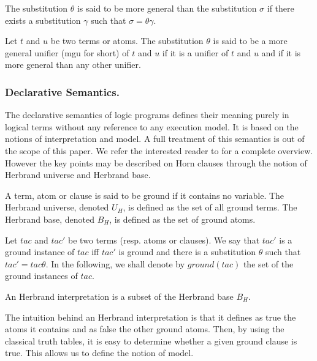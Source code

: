 \begin{definition}
The substitution $\theta$ is said to be more general than the
substitution $\sigma$ if there exists a substitution $\gamma$ such
that $\sigma = \theta\gamma$.
\end{definition}

\begin{definition}
Let $t$ and $u$ be two terms or atoms. The substitution $\theta$ is
said to be a more general unifier (mgu for short) of $t$ and $u$ if it
is a unifier of $t$ and $u$ and if it is more general than any other
unifier.
\end{definition}

\subsubsection{Declarative Semantics.}
The declarative semantics of logic programs defines their meaning
purely in logical terms without any reference to any execution
model. It is based on the notions of interpretation and model. A full
treatment of this semantics is out of the scope of this paper. We
refer the interested reader to \cite{Lloyd} for a complete
overview. However the key points may be described on Horn clauses
through the notion of Herbrand universe and Herbrand base.

\begin{definition}
A term, atom or clause is said to be ground if it contains no
variable. The Herbrand universe, denoted $U_H$, is defined as the set
of all ground terms. The Herbrand base, denoted $B_H$, is defined as
the set of ground atoms.
\end{definition}

\begin{definition}
Let $tac$ and $tac'$ be two terms (resp. atoms or clauses). We say
that $tac'$ is a ground instance of $tac$ iff $tac'$ is ground and
there is a substitution $\theta$ such that $tac' = tac\theta$. In the
following, we shall denote by $\mathit{ground(tac)}$ the set of the
ground instances of $tac$.
\end{definition}


\begin{definition}
An Herbrand interpretation is a subset of the Herbrand base $B_H$.
\end{definition}

The intuition behind an Herbrand interpretation is that it defines as
true the atoms it contains and as false the other ground atoms. Then,
by using the classical truth tables, it is easy to determine whether a
given ground clause is true. This allows us to define the notion of model.

